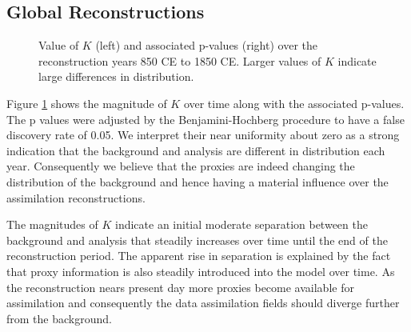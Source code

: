 \documentclass[12pt]{article}
\begin{document}
\subsection{Global Reconstructions} \label{global}

\begin{figure}
  \centering
  \caption{Value of $K$ (left) and associated p-values (right) over the reconstruction years 850 CE to 1850 CE. Larger values of $K$ indicate large differences in distribution.}
  \label{global_results}
\end{figure}

Figure \ref{global_results} shows the magnitude of $K$ over time along with the associated p-values. The p values were adjusted by the Benjamini-Hochberg procedure to have a false discovery rate of 0.05. We interpret their near uniformity about zero as a strong indication that the background and analysis are different in distribution each year. Consequently we believe that the proxies are indeed changing the distribution of the background and hence having a material influence over the assimilation reconstructions.

The magnitudes of $K$ indicate an initial moderate separation between the background and analysis that steadily increases over time until the end of the reconstruction period. The apparent rise in separation is explained by the fact that proxy information is also steadily introduced into the model over time. As the reconstruction nears present day more proxies become available for assimilation and consequently the data assimilation fields should diverge further from the background.
\end{document}
